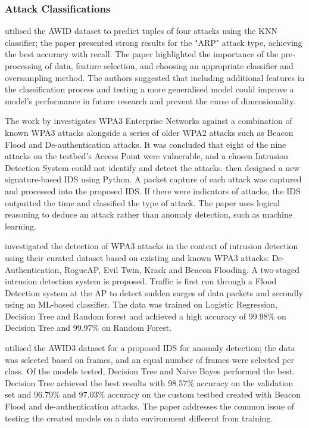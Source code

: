 \subsubsection*{Attack Classifications}

\textcite{10.1007/978-3-030-98457-1_1} utilised the AWID dataset to predict tuples of four attacks using the KNN classifier; the paper presented strong results for the "ARP" attack type, achieving the best accuracy with recall. The paper highlighted the importance of the pre-processing of data, feature selection, and choosing an appropriate classifier and oversampling method. The authors suggested that including additional features in the classification process and testing a more generalised model could improve a model's performance in future research and prevent the curse of dimensionality.

\medskip
The work by \textcite{DBLP:journals/corr/abs-2110-04259} investigates WPA3 Enterprise Networks against a combination of known WPA3 attacks alongside a series of older WPA2 attacks such as Beacon Flood and De-authentication attacks. It was concluded that eight of the nine attacks on the testbed's Access Point were vulnerable, and a chosen Intrusion Detection System could not identify and detect the attacks. \textcite{DBLP:journals/corr/abs-2110-04259} then designed a new signature-based IDS using Python. A packet capture of each attack was captured and processed into the proposed IDS. If there were indicators of attacks, the IDS outputted the time and classified the type of attack. The paper uses logical reasoning to deduce an attack rather than anomaly detection, such as machine learning.

\medskip

\textcite{pub.1154431160} investigated the detection of WPA3 attacks in the context of intrusion detection using their curated dataset based on existing and known WPA3 attacks: De-Authentication, RogueAP, Evil Twin, Krack and Beacon Flooding. A two-staged intrusion detection system is proposed. Traffic is first run through a Flood Detection system at the AP to detect sudden surges of data packets and secondly using an ML-based classifier. The data was trained on Logistic Regression, Decision Tree and Random forest and achieved a high accuracy of 99.98\% on Decision Tree and 99.97\% on Random Forest. 

\textcite{electronics12112355} utilised the AWID3 dataset for a proposed IDS for anomaly detection; the data was selected based on frames, and an equal number of frames were selected per class. Of the models tested, Decision Tree and Naive Bayes performed the best. Decision Tree achieved the best results with 98.57\% accuracy on the validation set and 96.79\% and 97.03\% accuracy on the custom testbed created with Beacon Flood and de-authentication attacks. The paper addresses the common issue of testing the created models on a data environment different from training.

